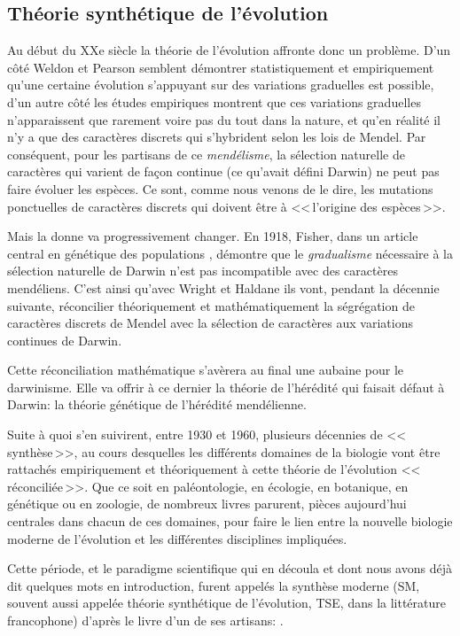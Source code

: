 \subsection{Théorie synthétique de l'évolution}\label{sec:SM}
Au début du XXe siècle la théorie de l'évolution affronte donc un problème. D'un côté Weldon et Pearson semblent démontrer statistiquement et empiriquement qu'une certaine évolution s'appuyant sur des variations graduelles est possible, d'un autre côté les études empiriques montrent que ces variations graduelles n'apparaissent que rarement voire pas du tout dans la nature, et qu'en réalité il n'y a que des caractères discrets qui s'hybrident selon les lois de Mendel. Par conséquent, pour les partisans de ce \emph{mendélisme}, la sélection naturelle de caractères qui varient de façon continue (ce qu'avait défini Darwin) ne peut pas faire évoluer les espèces. Ce sont, comme nous venons de le dire, les mutations ponctuelles de caractères discrets qui doivent être à <<\,l'origine des espèces\,>>. 

Mais la donne va progressivement changer. En 1918, Fisher, dans un article central en génétique des populations \citep{fisher1918thecorrelationbetweenrelativesonthesuppositionofmendelianinheritance}, démontre que le \emph{gradualisme} nécessaire à la sélection naturelle de Darwin n'est pas incompatible avec des caractères mendéliens. C'est ainsi qu'avec Wright et Haldane ils vont, pendant la décennie suivante, réconcilier théoriquement et mathématiquement la ségrégation de caractères discrets de Mendel avec la sélection de caractères aux variations continues de Darwin. 

Cette réconciliation mathématique s'avèrera au final une aubaine pour le darwinisme. Elle va offrir à ce dernier la théorie de l'hérédité qui faisait défaut à Darwin: la théorie génétique de l'hérédité mendélienne.

Suite à quoi s'en suivirent, entre 1930 et 1960, plusieurs décennies de <<\,synthèse\,>>, au cours desquelles les différents domaines de la biologie vont être rattachés empiriquement et théoriquement à cette théorie de l'évolution <<\,réconciliée\,>>. Que ce soit en paléontologie, en écologie, en botanique, en génétique ou en zoologie, de nombreux livres parurent, pièces aujourd'hui centrales dans chacun de ces domaines, pour faire le lien entre la nouvelle biologie moderne de l'évolution et les différentes disciplines impliquées.

Cette période, et le paradigme scientifique qui en découla et dont nous avons déjà dit quelques mots en introduction, furent appelés la synthèse moderne (SM, souvent aussi appelée théorie synthétique de l'évolution, TSE, dans la littérature francophone) d'après le livre d'un de ses artisans: \cite{huxley1942evolution}. 

